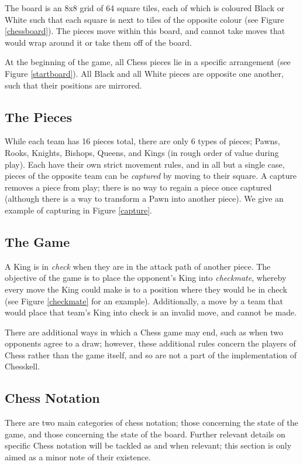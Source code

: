 \documentclass[12pt, a4paper, bibliography=totocnumbered]{scrreprt}
\begin{document}
The board is an 8x8 grid of 64 square tiles, each of which is coloured Black or White such that each square is next to tiles of the opposite colour (see Figure \ref{chessboard}). The pieces move within this board, and cannot take moves that would wrap around it or take them off of the board.

At the beginning of the game, all Chess pieces lie in a specific arrangement (see Figure \ref{startboard}). All Black and all White pieces are opposite one another, such that their positions are mirrored.

\subsection{The Pieces}

While each team has 16 pieces total, there are only 6 types of pieces; Pawns, Rooks, Knights, Bishops, Queens, and Kings (in rough order of value during play). Each have their own strict movement rules, and in all but a single case, pieces of the opposite team can be \emph{captured} by moving to their square. A capture removes a piece from play; there is no way to regain a piece once captured (although there is a way to transform a Pawn into another piece). We give an example of capturing in Figure \ref{capture}.

\subsection{The Game}

A King is in \emph{check} when they are in the attack path of another piece. The objective of the game is to place the opponent's King into \emph{checkmate}, whereby every move the King could make is to a position where they would be in check (see Figure \ref{checkmate} for an example). Additionally, a move by a team that would place that team's King into check is an invalid move, and cannot be made.

There are additional ways in which a Chess game may end, such as when two opponents agree to a draw; however, these additional rules concern the players of Chess rather than the game itself, and so are not a part of the implementation of Chesskell.

\subsection{Chess Notation}

There are two main categories of chess notation; those concerning the state of the game, and those concerning the state of the board. Further relevant details on specific Chess notation will be tackled as and when relevant; this section is only aimed as a minor note of their existence.
\end{document}

